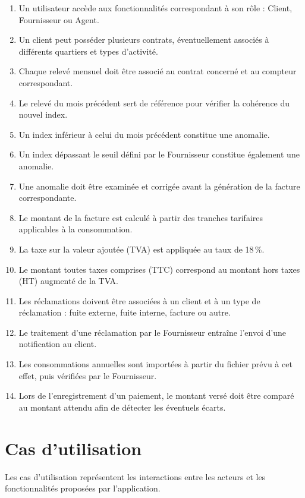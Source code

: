 \begin{enumerate}[leftmargin=*]
    \item Un utilisateur accède aux fonctionnalités correspondant à son rôle : Client, Fournisseur ou Agent.
    \item Un client peut posséder plusieurs contrats, éventuellement associés à différents quartiers et types d'activité.
    \item Chaque relevé mensuel doit être associé au contrat concerné et au compteur correspondant.
    \item Le relevé du mois précédent sert de référence pour vérifier la cohérence du nouvel index.
    \item Un index inférieur à celui du mois précédent constitue une anomalie.
    \item Un index dépassant le seuil défini par le Fournisseur constitue également une anomalie.
    \item Une anomalie doit être examinée et corrigée avant la génération de la facture correspondante.
    \item Le montant de la facture est calculé à partir des tranches tarifaires applicables à la consommation.
    \item La taxe sur la valeur ajoutée (TVA) est appliquée au taux de 18\,\%.
    \item Le montant toutes taxes comprises (TTC) correspond au montant hors taxes (HT) augmenté de la TVA.
    \item Les réclamations doivent être associées à un client et à un type de réclamation : fuite externe, fuite interne, facture ou autre.
    \item Le traitement d'une réclamation par le Fournisseur entraîne l'envoi d'une notification au client.
    \item Les consommations annuelles sont importées à partir du fichier prévu à cet effet, puis vérifiées par le Fournisseur.
    \item Lors de l'enregistrement d'un paiement, le montant versé doit être comparé au montant attendu afin de détecter les éventuels écarts.
\end{enumerate}

\section{Cas d'utilisation}

Les cas d'utilisation représentent les interactions entre les acteurs et les fonctionnalités proposées par l'application.

